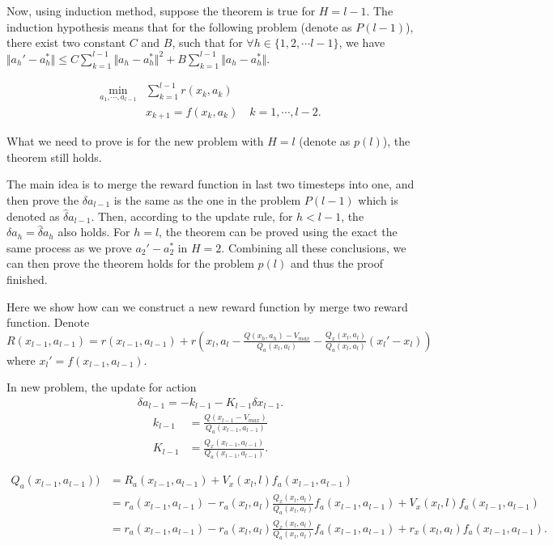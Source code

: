 \documentclass{article} %
\newcommand{\vmax}{V_{max}}
\begin{document}
Now, using induction method, suppose the theorem is true for $H=l-1$.
The induction hypothesis means that for the following problem (denote as $P(l-1)$), there exist two constant $C$ and $B$, such that for $\forall h \in \{1, 2, \cdots l-1\}$, we have $ \Vert a_h' - a_h^*  \Vert \le C \sum_{k=1}^{l-1} \Vert a_h - a_h^*  \Vert ^2 + B \sum_{k=1}^{l-1} \Vert a_h - a_h^*  \Vert  $.

\begin{align}
    \min_{a_1, \cdots, a_{l-1}} & \sum_{k=1}^{l-1}r(x_k, a_k)\\
    & x_{k+1} = f(x_k,a_k)  \quad k=1,\cdots, l-2.
\end{align}

What we need to prove is for the new problem with  $H=l$ (denote as $p(l)$), the   theorem still holds. 

The main idea is to merge the reward function in  last two timesteps into one, and then prove the $\delta a_{l-1}$ is the same as the one in the problem $P(l-1)$ which is denoted as $\hat{\delta} a_{l-1}$. Then, according to the update rule, for $h < l-1$, the $\delta a_h = \hat{\delta}a_h$ also holds. For $h=l$, the theorem can be proved using the exact the same process as we prove $a_2'-a_2^*$ in $H=2$. Combining all these conclusions, we can then prove the theorem holds for the problem $p(l)$ and thus  the proof finished.

Here we show how can we construct a new reward function by  merge two reward function. Denote $R(x_{l-1},a_{l-1}) = r(x_{l-1}, a_{l-1}) + r(x_{l}, a_{l} - \frac{Q(x_h,a_h) - \vmax}{Q_a(x_l, a_l)} - \frac{Q_x(x_l,a_l)}{Q_a(x_l, a_l)}(x_l' - x_l)  )$ where $x_l' = f(x_{l-1}, a_{l-1})$.

In new problem, the update for action 
\begin{align}
    \delta a_{l-1} = - k_{l-1} - K_{l-1}\delta x_{l-1}.
\end{align}
\begin{align}
    k_{l-1} &= \frac{Q(x_{l-1} - \vmax)}{Q_a(x_{l-1}, a_{l-1})}\\
    K_{l-1} &= \frac{Q_x(x_{l-1}, a_{l-1})}{Q_a(x_{l-1}, a_{l-1})}.
\end{align}

\begin{align}
    Q_a(x_{l-1}, a_{l-1}))&=R_a(x_{l-1},a_{l-1})  +  V_x(x_l, l)f_a(x_{l-1}, a_{l-1})\\
    &= r_a(x_{l-1}, a_{l-1}) - r_a(x_l,a_l)\frac{Q_x(x_l, a_l)}{Q_a(x_l, a_l)}f_a(x_{l-1}, a_{l-1}) + V_x(x_l, l)f_a(x_{l-1}, a_{l-1}) \\
    &= r_a(x_{l-1}, a_{l-1}) - r_a(x_l,a_l)\frac{Q_x(x_l, a_l)}{Q_a(x_l, a_l)}f_a(x_{l-1}, a_{l-1}) + r_x(x_l, a_l)f_a(x_{l-1}, a_{l-1}).
\end{align}
 
\end{document}
